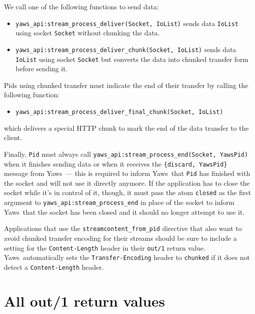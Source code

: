 \documentclass[11pt,oneside,english]{book}
\newcommand{\Yaws}            %
        {{\sc Yaws}}
\begin{document}
We call one of the following functions to send data:
\begin{itemize}
\item \verb+yaws_api:stream_process_deliver(Socket, IoList)+ sends
  data \verb+IoList+ using socket \verb+Socket+ without chunking the
  data.

\item \verb+yaws_api:stream_process_deliver_chunk(Socket, IoList)+
  sends data \verb+IoList+ using socket \verb+Socket+ but converts
  the data into chunked transfer form before sending it.
\end{itemize}

Pids using chunked transfer must indicate the end of their transfer by
calling the following function:
\begin{itemize}
\item \verb+yaws_api:stream_process_deliver_final_chunk(Socket, IoList)+
\end{itemize}

which delivers a special HTTP chunk to mark the end of the data
transfer to the client.

Finally, \verb+Pid+ must always call
\verb+yaws_api:stream_process_end(Socket, YawsPid)+ when it finishes
sending data or when it receives the \verb+{discard, YawsPid}+ message
from \Yaws\ --- this is required to inform \Yaws\ that \verb+Pid+ has
finished with the socket and will not use it directly anymore. If the
application has to close the socket while it's in control of it,
though, it must pass the atom \verb+closed+ as the first argument to
\verb+yaws_api:stream_process_end+ in place of the socket to inform
\Yaws\ that the socket has been closed and it should no longer attempt
to use it.

App\-li\-ca\-tions that use the \verb+streamcontent_from_pid+
directive that also want to a\-void chunked transfer encoding for
their streams should be sure to include a set\-ting for the
\verb+Content-Length+ header in their \verb+out/1+ return
value. \Yaws\ au\-to\-mat\-i\-cal\-ly sets the
\verb+Transfer-Encoding+ head\-er to \verb+chunked+ if it does not
detect a \verb+Content-Length+ header.

\section{All out/1 return values}
\end{document}
